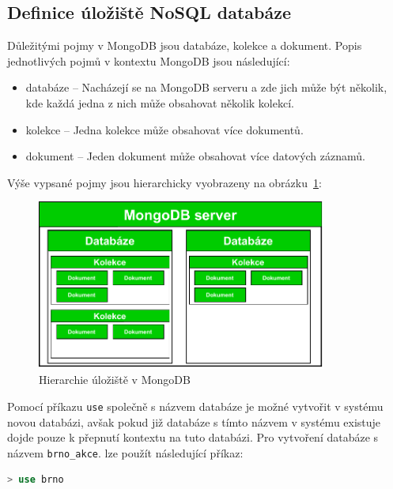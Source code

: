 \documentclass[a4paper, 11pt]{article}
\begin{document}
    \subsection{Definice úložiště NoSQL databáze}
    Důležitými pojmy v MongoDB jsou databáze, kolekce a dokument. Popis jednotlivých pojmů v kontextu MongoDB jsou následující:
    \begin{itemize}
        \item databáze -- Nacházejí se na MongoDB serveru a zde jich může být několik, kde každá jedna z nich může obsahovat několik kolekcí.
        \item kolekce -- Jedna kolekce může obsahovat více dokumentů.
        \item dokument -- Jeden dokument může obsahovat více datových záznamů.
    \end{itemize}
    \newpage
    Výše vypsané pojmy jsou hierarchicky vyobrazeny na obrázku~\ref{MongoHier}:
    \begin{figure}[ht!]
        \centering
        \includegraphics[width=0.85\textwidth]{img/MongoDB.pdf}
        \caption{Hierarchie úložiště v MongoDB \label{MongoHier}}
    \end{figure}
    
    Pomocí příkazu \texttt{use} společně s názvem databáze je možné vytvořit v systému novou databázi, avšak pokud již databáze s tímto názvem v systému existuje dojde pouze k přepnutí kontextu na tuto databázi. Pro vytvoření databáze s názvem \texttt{brno\_akce}. lze použít následující příkaz:
    \begin{lstlisting}[style=NoSQL, language=SQL, framesep=10pt]
        > use brno
    \end{lstlisting}
    
\end{document}

